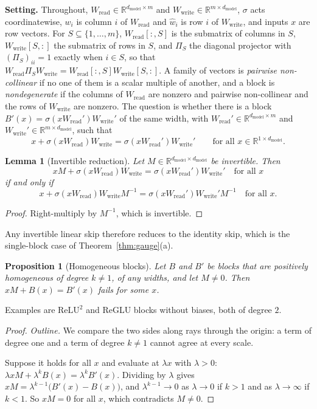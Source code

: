 \documentclass[10pt]{article}
\newtheorem{proposition}[theorem]{Proposition}
\newtheorem{lemma}[theorem]{Lemma}
\theoremstyle{definition}
\theoremstyle{remark}
\newcommand{\R}{\mathbb{R}}
\newcommand{\Wread}{W_{\mathrm{read}}}
\newcommand{\Wwrite}{W_{\mathrm{write}}}
\newcommand{\dm}{d_{\mathrm{model}}}
\newcommand{\para}[1]{\smallskip\noindent\textbf{#1}\hspace{0.5em}}
\begin{document}
\para{Setting.} Throughout, $\Wread \in \R^{\dm \times m}$ and $\Wwrite \in \R^{m \times \dm}$, $\sigma$ acts coordinatewise, $w_i$ is column $i$ of $\Wread$ and $\hat w_i$ is row $i$ of $\Wwrite$, and inputs $x$ are row vectors. For $S \subseteq \{1, \dots, m\}$, $\Wread[{:},S]$ is the submatrix of columns in $S$, $\Wwrite[S,{:}]$ the submatrix of rows in $S$, and $\Pi_S$ the diagonal projector with $(\Pi_S)_{ii} = 1$ exactly when $i \in S$, so that $\Wread\Pi_S\Wwrite = \Wread[{:},S]\Wwrite[S,{:}]$. A family of vectors is \emph{pairwise non-collinear} if no one of them is a scalar multiple of another, and a block is \emph{nondegenerate} if the columns of $\Wread$ are nonzero and pairwise non-collinear and the rows of $\Wwrite$ are nonzero. The question is whether there is a block $B'(x) = \sigma(x\Wread')\Wwrite'$ of the same width, with $\Wread' \in \R^{\dm\times m}$ and $\Wwrite' \in \R^{m \times \dm}$, such that
\begin{equation}\label{eq:absorb}
x + \sigma(x\Wread)\Wwrite = \sigma(x\Wread')\Wwrite'\qquad\text{for all } x \in \R^{1\times\dm} .
\end{equation}

\begin{lemma}[Invertible reduction]\label{lem:f1}
Let $M \in \R^{\dm\times \dm}$ be invertible. Then
\[
xM + \sigma(x\Wread)\Wwrite = \sigma(x\Wread')\Wwrite'\quad\text{for all } x
\]
if and only if
\[
x + \sigma(x\Wread)\Wwrite M^{-1} = \sigma(x\Wread')\Wwrite' M^{-1}\quad\text{for all } x.
\]
\end{lemma}
\begin{proof}
Right-multiply by $M^{-1}$, which is invertible.
\end{proof}
Any invertible linear skip therefore reduces to the identity skip, which is the single-block case of Theorem~\ref{thm:gauge}(a).

\begin{proposition}[Homogeneous blocks]\label{prop:f2}
Let $B$ and $B'$ be blocks that are positively homogeneous of degree $k \neq 1$, of any widths, and let $M \neq 0$. Then $xM + B(x) = B'(x)$ fails for some $x$.
\end{proposition}
Examples are $\mathrm{ReLU}^2$ and ReGLU blocks without biases, both of degree $2$.
\begin{proof}
\emph{Outline.} We compare the two sides along rays through the origin: a term of degree one and a term of degree $k \neq 1$ cannot agree at every scale.

Suppose it holds for all $x$ and evaluate at $\lambda x$ with $\lambda > 0$: $\lambda xM + \lambda^kB(x) = \lambda^kB'(x)$. Dividing by $\lambda$ gives $xM = \lambda^{k-1}\big(B'(x) - B(x)\big)$, and $\lambda^{k-1} \to 0$ as $\lambda \to 0$ if $k > 1$ and as $\lambda \to \infty$ if $k < 1$. So $xM = 0$ for all $x$, which contradicts $M \neq 0$.
\end{proof}
\end{document}
